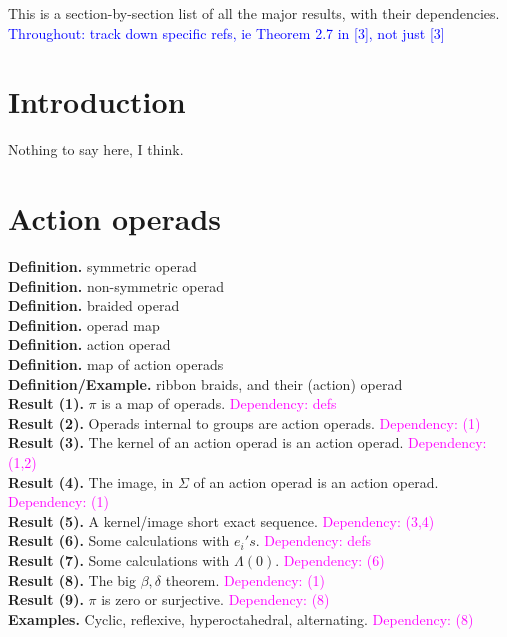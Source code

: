 \documentclass{amsart}
\begin{document}
This is a section-by-section list of all the major results, with their dependencies.
\textcolor{blue}{Throughout: track down specific refs, ie Theorem 2.7 in [3], not just [3]}

\section{Introduction}

Nothing to say here, I think.

\section{Action operads}

\textbf{Definition.} symmetric operad
\\ \textbf{Definition.} non-symmetric operad
\\ \textbf{Definition.} braided operad
\\ \textbf{Definition.} operad map
\\ \textbf{Definition.} action operad
\\ \textbf{Definition.} map of action operads
\\ \textbf{Definition/Example.} ribbon braids, and their (action) operad
\\ \textbf{Result (1).} $\pi$ is a map of operads. \textcolor{magenta}{Dependency: defs}
\\ \textbf{Result (2).} Operads internal to groups are action operads. \textcolor{magenta}{Dependency: (1)}
\\ \textbf{Result (3).} The kernel of an action operad is an action operad. \textcolor{magenta}{Dependency: (1,2)}
\\ \textbf{Result (4).} The image, in $\Sigma$ of an action operad is an action operad. \textcolor{magenta}{Dependency: (1)}
\\ \textbf{Result (5).} A kernel/image short exact sequence. \textcolor{magenta}{Dependency: (3,4)}
\\ \textbf{Result (6).} Some calculations with $e_i's$. \textcolor{magenta}{Dependency: defs}
\\ \textbf{Result (7).} Some calculations with $\Lambda(0)$. \textcolor{magenta}{Dependency: (6)}
\\ \textbf{Result (8).} The big $\beta, \delta$ theorem. \textcolor{magenta}{Dependency: (1)}
\\ \textbf{Result (9).} $\pi$ is zero or surjective. \textcolor{magenta}{Dependency: (8)}
\\ \textbf{Examples.} Cyclic, reflexive, hyperoctahedral, alternating. \textcolor{magenta}{Dependency: (8)}
\end{document}
